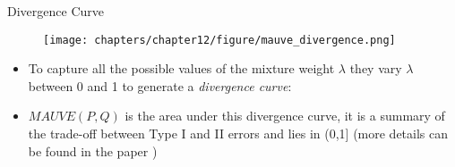 \begin{vbframe}{Divergence Curve}

\begin{figure}
    \centering
    \texttt{[image: chapters/chapter12/figure/mauve\_divergence.png]}
\end{figure}

\begin{itemize}
    \item To capture all the possible values of the mixture weight $\lambda$ they vary $\lambda$ between 0 and 1 to generate a \textit{divergence curve}:
\end{itemize}
\begin{itemize}
    \item $MAUVE(P,Q)$ is the area under this divergence curve, it is a summary of the trade-off between Type I and II errors and lies in (0,1] (more details can be found in the paper )
\end{itemize}
    
\end{vbframe}

